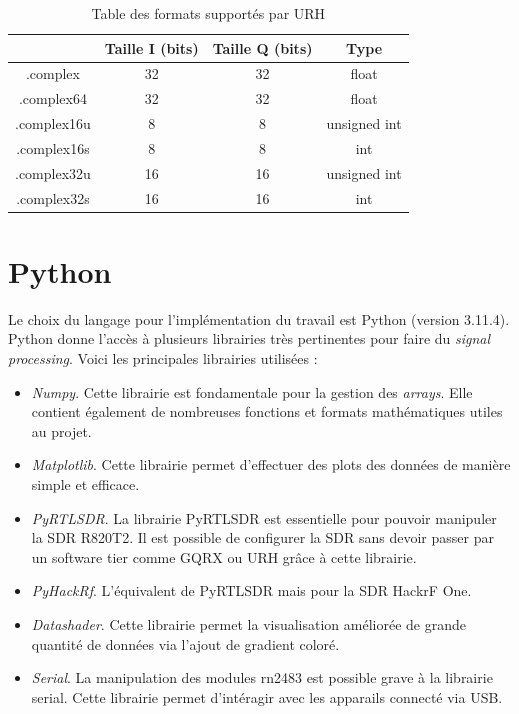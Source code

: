 \begin{table}[h]
\centering
\begin{tabular}{|c|c|c|c|}
\hline
\multicolumn{1}{|c|}{} & \multicolumn{1}{c|}{Taille I (bits)} &\multicolumn{1}{c|}{Taille Q (bits)} & \multicolumn{1}{c|}{Type}\\
\hline
.complex & 32 & 32 & float \\
\hline
.complex64 & 32 & 32 & float\\
\hline
.complex16u & 8 & 8 & unsigned int\\
\hline
.complex16s &  8 & 8 & int\\
\hline
.complex32u & 16 & 16 & unsigned int \\
\hline
.complex32s & 16 & 16 & int  \\
\hline
\end{tabular}
\caption{Table des formats supportés par URH}
\label{format}
\end{table}



\section{Python}

Le choix du langage pour l'implémentation du travail est Python (version 3.11.4). Python donne l'accès à plusieurs librairies très pertinentes pour faire du \textit{signal processing}. Voici les principales librairies utilisées :

\vspace{0.1cm}

\begin{itemize}
\item \textit{Numpy}. Cette librairie est fondamentale pour la gestion des \textit{arrays}. Elle contient également de nombreuses fonctions et formats mathématiques utiles au projet.
\item \textit{Matplotlib}. Cette librairie permet d'effectuer des plots des données de manière simple et efficace.
\item \textit{PyRTLSDR}. La librairie PyRTLSDR est essentielle pour pouvoir manipuler la SDR R820T2. Il est possible de configurer la SDR sans devoir passer par un software tier comme GQRX ou URH grâce à cette librairie.
\item \textit{PyHackRf}. L'équivalent de PyRTLSDR mais pour la SDR HackrF One.
\item \textit{Datashader}. Cette librairie permet la visualisation améliorée de grande quantité de données via l'ajout de gradient coloré.
\item \textit{Serial}. La manipulation des modules rn2483 est possible grave à la librairie serial. Cette librairie permet d'intéragir avec les apparails connecté via USB.
\end{itemize}

